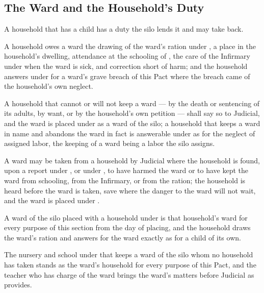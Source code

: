 \begin{setclose}
\section{The Ward and the Household's Duty}
\label{sec:marriage:ward-and-the-households-duty}

A household that has a child has a duty the silo lends it and may take back.

\begin{clauses}
\item A household owes a ward the drawing of the ward's ration under , a place in the household's dwelling, attendance at the schooling of , the care of the Infirmary under  when the ward is sick, and correction short of harm; and the household answers under  for a ward's grave breach of this Pact where the breach came of the household's own neglect.
\item A household that cannot or will not keep a ward --- by the death or sentencing of its adults, by want, or by the household's own petition --- shall say so to Judicial, and the ward is placed under  as a ward of the silo; a household that keeps a ward in name and abandons the ward in fact is answerable under  as for the neglect of assigned labor, the keeping of a ward being a labor the silo assigns.
\item A ward may be taken from a household by Judicial where the household is found, upon a report under , or under , to have harmed the ward or to have kept the ward from schooling, from the Infirmary, or from the ration; the household is heard before the ward is taken, save where the danger to the ward will not wait, and the ward is placed under .
\item A ward of the silo placed with a household under  is that household's ward for every purpose of this section from the day of placing, and the household draws the ward's ration and answers for the ward exactly as for a child of its own.
\item The nursery and school under  that keeps a ward of the silo whom no household has taken stands as the ward's household for every purpose of this Pact, and the teacher who has charge of the ward brings the ward's matters before Judicial as  provides.
\end{clauses}


\end{setclose}
